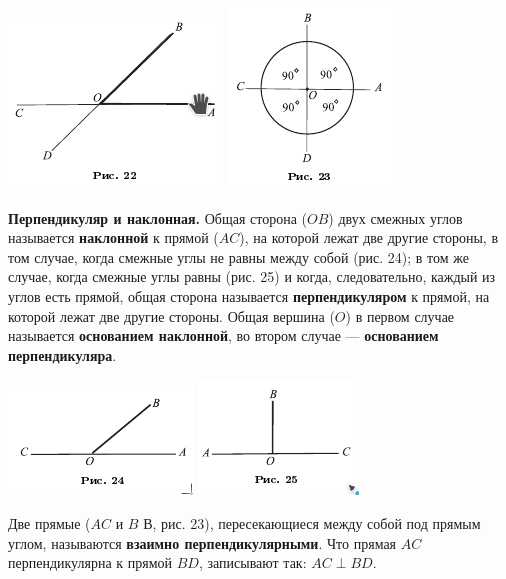 \documentclass[oneside]{book}
\begin{document}
\includegraphics{pics/ris-22}
\includegraphics{pics/ris-23}

\textbf{Перпендикуляр и наклонная.}
Общая сторона ($OB$) двух смежных углов называется \textbf{наклонной} к прямой ($AC$), на которой лежат две другие стороны, в том случае, когда смежные углы не равны между собой (рис. 24);
в том же случае, когда смежные углы равны (рис. 25) и когда, следовательно, каждый из углов есть прямой, общая сторона называется \textbf{перпендикуляром} к прямой, на которой лежат две другие стороны.
Общая вершина ($O$) в первом случае называется \textbf{основанием наклонной}, во втором случае — \textbf{основанием перпендикуляра}.

\includegraphics{pics/ris-24}
\includegraphics{pics/ris-25}

Две прямые ($AC$ и $B$ В, рис. 23), пересекающиеся между собой под прямым углом, называются \textbf{взаимно перпендикулярными}.
Что прямая $AC$ перпендикулярна к прямой $BD$, записывают так: $AC\perp BD$.
\end{document}
